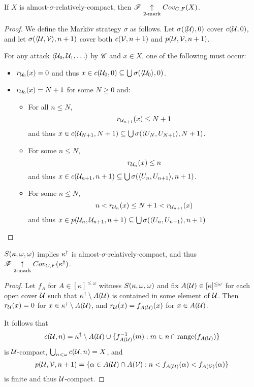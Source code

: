 \begin{thm}
  If $X$ is almost-$\sigma$-relatively-compact, then
  $\mathscr{F}\underset{2\text{-mark}}{\uparrow}Cov_{C,F}(X)$.
\end{thm}

\begin{proof}
  We define the Mark\"ov strategy $\sigma$ as follows.
  Let $\sigma(\langle\mathcal{U}\rangle,0)$ cover $c(\mathcal{U},0)$, and let
  $\sigma(\langle\mathcal{U},\mathcal{V}\rangle,n+1)$ cover both $c(\mathcal{V},n+1)$ and
  $p(\mathcal{U}, \mathcal{V},n+1)$.

  For any attack $\<\mc{U}_0,\mc{U}_1,\dots\>$ by $\mathscr{C}$ and $x\in X$,
  one of the following must occur:

  \begin{itemize}
    \item
      $r_{\mathcal{U}_0}(x)=0$ and thus
      $x\in c(\mathcal{U}_0,0)\subseteq \bigcup \sigma(\langle\mathcal{U}_0\rangle,0)$.

    \item
      $r_{\mathcal{U}_0}(x)=N+1$ for some $N\geq 0$ and:
      \begin{itemize}
        \item
          For all $n\leq N$,
          \[
            r_{\mathcal{U}_{n+1}}(x)\leq N+1
          \]
          and thus
          $x\in c(\mathcal{U}_{N+1},N+1) \subseteq
            \bigcup \sigma(\langle U_N,U_{N+1}\rangle,N+1)$.
        \item
          For some $n \leq N$,
          \[ r_{\mathcal{U}_n}(x)\leq n \]
          and thus
          $x\in c(\mathcal{U}_{n+1},n+1) \subseteq
            \bigcup \sigma(\langle U_n,U_{n+1}\rangle,n+1)$.
        \item
          For some $n \leq N$,
          \[
            n < r_{\mathcal{U}_n}(x)\leq N+1 < r_{\mathcal{U}_{n+1}}(x)
          \]
         and thus
         $x\in p(\mathcal{U}_n,\mathcal{U}_{n+1},n+1) \subseteq
          \bigcup \sigma(\langle U_n,U_{n+1}\rangle,n+1)$
       \end{itemize}
  \end{itemize}
\end{proof}

\begin{thm}
  $S(\kappa,\omega,\omega)$ implies $\kappa^\dagger$ is
  almost-$\sigma$-relatively-compact, and thus
  $\mathscr{F}\underset{2\text{-mark}}{\uparrow}Cov_{C,F}(\kappa^\dagger)$.
\end{thm}

\begin{proof}
  Let $f_A$ for $A\in[\kappa]^{\leq\omega}$ witness $S(\kappa,\omega,\omega)$ and fix
  $A(\mathcal{U})\in[\kappa]^{\leq\omega}$ for each open cover $\mathcal{U}$ such that
  $\kappa^\dagger\setminus A(\mathcal{U})$ is contained in some element of
  $\mathcal{U}$.
  Then $r_{\mathcal{U}}(x)=0$ for $x\in\kappa^\dagger\setminus A(\mathcal{U})$,
  and $r_{\mathcal{U}}(x)=f_{A(\mathcal{U})}(x)$ for $x\in A(\mathcal{U})$.

  It follows that
    \[
      c(\mathcal{U},n)
        =
      \kappa^\dagger\setminus A(\mathcal{U})
        \cup
      \{f_{A(\mathcal{U})}^{-1}(m) : m\in n\cap\text{range}(f_{A(\mathcal{U})}) \}
    \]
  is $\mathcal{U}$-compact, $\bigcup_{n<\omega}c(\mathcal{U},n)=X$, and
    \[
      p(\mathcal{U},\mathcal{V},n+1)
        =
      \{
        \alpha\in A(\mathcal{U})\cap A(\mathcal{V})
          :
        n < f_{A(\mathcal{U})}(\alpha) < f_{A(\mathcal{V})}(\alpha)
      \}
    \]
  is finite and thus $\mathcal{U}$-compact.
\end{proof}

